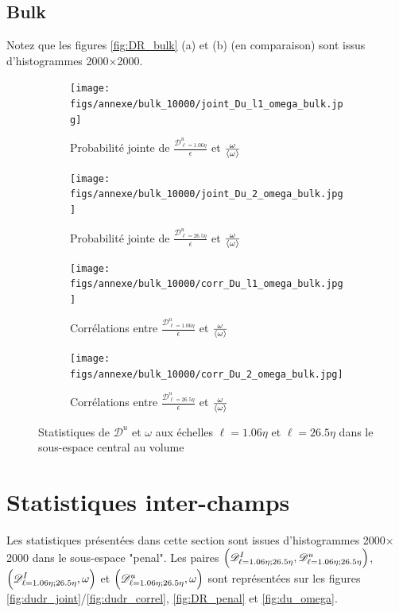 \documentclass[13pt, a4paper]{extarticle}
\begin{document}
\subsection{Bulk}
\noindent Notez que les figures \ref{fig:DR_bulk} (a) et (b) (en comparaison)
sont issus d'histogrammes 2000$\times$2000.
\begin{figure}[H]
  \centering
  \begin{subfigure}[b]{0.48\linewidth}
  \centering
  \texttt{[image: figs/annexe/bulk\_10000/joint\_Du\_l1\_omega\_bulk.jpg]}
  \caption{Probabilité jointe de $\frac{\mathscr{D}^u_{\ell=1.06\eta}}{\epsilon}$ et 
  $\frac{\omega}{\left\langle \omega\right\rangle}$}
  \end{subfigure}
  \begin{subfigure}[b]{0.48\linewidth}
    \centering
    \texttt{[image: figs/annexe/bulk\_10000/joint\_Du\_2\_omega\_bulk.jpg]}
    \caption{Probabilité jointe de $\frac{\mathscr{D}^u_{\ell=26.5\eta}}{\epsilon}$ et 
    $\frac{\omega}{\left\langle \omega\right\rangle}$}
    \end{subfigure}
    \begin{subfigure}[b]{0.48\linewidth}
      \centering
      \texttt{[image: figs/annexe/bulk\_10000/corr\_Du\_l1\_omega\_bulk.jpg]}
      \caption{Corrélations entre $\frac{\mathscr{D}^u_{\ell=1.06\eta}}{\epsilon}$ et 
      $\frac{\omega}{\left\langle \omega\right\rangle}$}
      \end{subfigure}
      \begin{subfigure}[b]{0.48\linewidth}
        \centering
        \texttt{[image: figs/annexe/bulk\_10000/corr\_Du\_2\_omega\_bulk.jpg]}
        \caption{Corrélations entre $\frac{\mathscr{D}^u_{\ell=26.5\eta}}{\epsilon}$ et 
        $\frac{\omega}{\left\langle \omega\right\rangle}$}
        \end{subfigure}
  \caption{Statistiques de $\mathscr{D}^u$ et $\omega$ aux échelles $\ell=1.06\eta$ et 
  $\ell=26.5\eta$ dans le sous-espace central au volume}
\end{figure}

\section{Statistiques inter-champs}\label{sec:pairs}
\noindent Les statistiques présentées dans cette section sont issues d'histogrammes
2000$\times$2000 dans le sous-espace "penal". Les paires 
$\qty(\mathscr{D}^I_{\ell=1.06\eta;26.5\eta}, \mathscr{D}^u_{\ell=1.06\eta;26.5\eta})$,
$\qty(\mathscr{D}^I_{\ell=1.06\eta;26.5\eta},\omega)$ et 
$\qty(\mathscr{D}^u_{\ell=1.06\eta;26.5\eta},\omega)$ sont représentées 
sur les figures \ref{fig:dudr_joint}/\ref{fig:dudr_correl}, \ref{fig:DR_penal} et 
\ref{fig:du_omega}.
\end{document}

